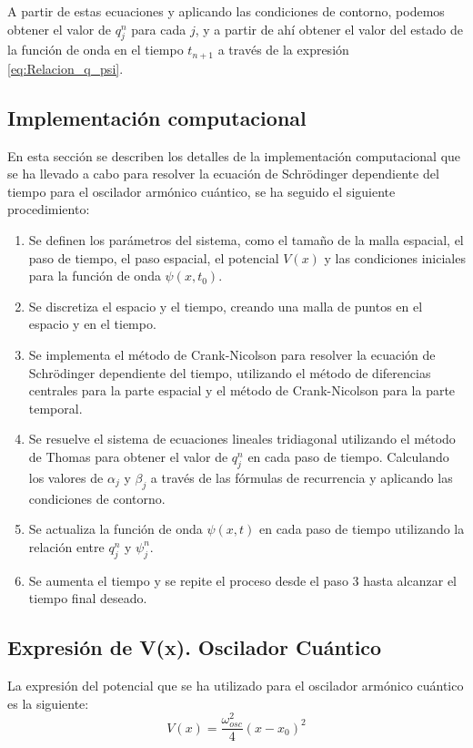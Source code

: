 \documentclass[10pt,onecolumn]{article}
\begin{document}
A partir de estas ecuaciones y aplicando las condiciones de contorno, podemos obtener el valor de $q^n_j$ para cada $j$, y a partir de ahí obtener el valor del estado de la función de onda en el tiempo $t_{n+1}$ a través de la expresión \ref{eq:Relacion_q_psi}.


\subsection{Implementación computacional}
En esta sección se describen los detalles de la implementación computacional que se ha llevado a cabo para resolver la ecuación de Schrödinger dependiente del tiempo para el oscilador armónico cuántico, se ha seguido el siguiente procedimiento:

\begin{enumerate}
    \item Se definen los parámetros del sistema, como el tamaño de la malla espacial, el paso de tiempo, el paso espacial, el potencial $V(x)$ y las condiciones iniciales para la función de onda $\psi(x,t_0)$.
    \item Se discretiza el espacio y el tiempo, creando una malla de puntos en el espacio y en el tiempo.
    \item Se implementa el método de Crank-Nicolson para resolver la ecuación de Schrödinger dependiente del tiempo, utilizando el método de diferencias centrales para la parte espacial y el método de Crank-Nicolson para la parte temporal.
    \item Se resuelve el sistema de ecuaciones lineales tridiagonal utilizando el método de Thomas para obtener el valor de $q^n_j$ en cada paso de tiempo. Calculando los valores de $\alpha_j$ y $\beta_j$ a través de las fórmulas de recurrencia y aplicando las condiciones de contorno.
    \item Se actualiza la función de onda $\psi(x,t)$ en cada paso de tiempo utilizando la relación entre $q^n_j$ y $\psi^n_j$.
    \item Se aumenta el tiempo y se repite el proceso desde el paso 3 hasta alcanzar el tiempo final deseado.
\end{enumerate}


\subsection{Expresión de V(x). Oscilador Cuántico}
La expresión del potencial que se ha utilizado para el oscilador armónico cuántico es la siguiente:
\begin{equation}\label{eq:Vx}
    V(x) = \dfrac{\omega_{osc}^2}{4} (x-x_0)^2
\end{equation}
\end{document}
